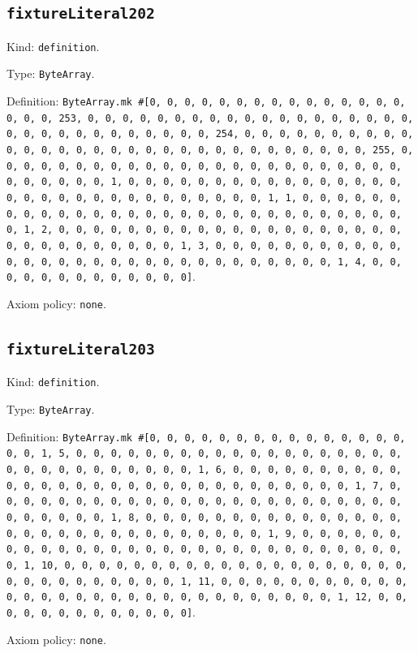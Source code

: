 \documentclass[11pt]{article}
\begin{document}
\subsection*{\texttt{fixtureLiteral202}}
\noindent Kind: \texttt{definition}.\par
\noindent Type: \texttt{ByteArray}.\par
\noindent Definition: \texttt{ByteArray.mk \#[0, 0, 0, 0, 0, 0, 0, 0, 0, 0, 0, 0, 0, 0, 0, 0, 0, 0, 253, 0, 0, 0, 0, 0, 0, 0, 0, 0, 0, 0, 0, 0, 0, 0, 0, 0, 0, 0, 0, 0, 0, 0, 0, 0, 0, 0, 0, 0, 0, 0, 254, 0, 0, 0, 0, 0, 0, 0, 0, 0, 0, 0, 0, 0, 0, 0, 0, 0, 0, 0, 0, 0, 0, 0, 0, 0, 0, 0, 0, 0, 0, 0, 255, 0, 0, 0, 0, 0, 0, 0, 0, 0, 0, 0, 0, 0, 0, 0, 0, 0, 0, 0, 0, 0, 0, 0, 0, 0, 0, 0, 0, 0, 0, 1, 0, 0, 0, 0, 0, 0, 0, 0, 0, 0, 0, 0, 0, 0, 0, 0, 0, 0, 0, 0, 0, 0, 0, 0, 0, 0, 0, 0, 0, 0, 0, 1, 1, 0, 0, 0, 0, 0, 0, 0, 0, 0, 0, 0, 0, 0, 0, 0, 0, 0, 0, 0, 0, 0, 0, 0, 0, 0, 0, 0, 0, 0, 0, 1, 2, 0, 0, 0, 0, 0, 0, 0, 0, 0, 0, 0, 0, 0, 0, 0, 0, 0, 0, 0, 0, 0, 0, 0, 0, 0, 0, 0, 0, 0, 0, 1, 3, 0, 0, 0, 0, 0, 0, 0, 0, 0, 0, 0, 0, 0, 0, 0, 0, 0, 0, 0, 0, 0, 0, 0, 0, 0, 0, 0, 0, 0, 0, 1, 4, 0, 0, 0, 0, 0, 0, 0, 0, 0, 0, 0, 0, 0]}.\par
\noindent Axiom policy: \texttt{none}.\par
\subsection*{\texttt{fixtureLiteral203}}
\noindent Kind: \texttt{definition}.\par
\noindent Type: \texttt{ByteArray}.\par
\noindent Definition: \texttt{ByteArray.mk \#[0, 0, 0, 0, 0, 0, 0, 0, 0, 0, 0, 0, 0, 0, 0, 0, 0, 1, 5, 0, 0, 0, 0, 0, 0, 0, 0, 0, 0, 0, 0, 0, 0, 0, 0, 0, 0, 0, 0, 0, 0, 0, 0, 0, 0, 0, 0, 0, 0, 1, 6, 0, 0, 0, 0, 0, 0, 0, 0, 0, 0, 0, 0, 0, 0, 0, 0, 0, 0, 0, 0, 0, 0, 0, 0, 0, 0, 0, 0, 0, 0, 1, 7, 0, 0, 0, 0, 0, 0, 0, 0, 0, 0, 0, 0, 0, 0, 0, 0, 0, 0, 0, 0, 0, 0, 0, 0, 0, 0, 0, 0, 0, 0, 1, 8, 0, 0, 0, 0, 0, 0, 0, 0, 0, 0, 0, 0, 0, 0, 0, 0, 0, 0, 0, 0, 0, 0, 0, 0, 0, 0, 0, 0, 0, 0, 1, 9, 0, 0, 0, 0, 0, 0, 0, 0, 0, 0, 0, 0, 0, 0, 0, 0, 0, 0, 0, 0, 0, 0, 0, 0, 0, 0, 0, 0, 0, 0, 1, 10, 0, 0, 0, 0, 0, 0, 0, 0, 0, 0, 0, 0, 0, 0, 0, 0, 0, 0, 0, 0, 0, 0, 0, 0, 0, 0, 0, 0, 0, 0, 1, 11, 0, 0, 0, 0, 0, 0, 0, 0, 0, 0, 0, 0, 0, 0, 0, 0, 0, 0, 0, 0, 0, 0, 0, 0, 0, 0, 0, 0, 0, 0, 1, 12, 0, 0, 0, 0, 0, 0, 0, 0, 0, 0, 0, 0, 0]}.\par
\noindent Axiom policy: \texttt{none}.\par
\end{document}
